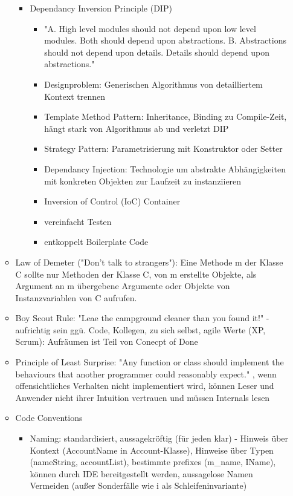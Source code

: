 \documentclass[paper=a4, fontsize=11pt]{scrartcl} %
\numberwithin{equation}{section} %
\numberwithin{figure}{section} %
\numberwithin{table}{section} %
\begin{document}
\begin{itemize}
\begin{itemize}
\begin{itemize}
\begin{itemize}
      \end{itemize}
      \item Dependancy Inversion Principle (DIP)
      \begin{itemize}
        \item "A. High level modules should not depend upon low level modules. Both should depend upon abstractions.
        B. Abstractions should not depend upon details. Details should depend upon abstractions."
        \item Designproblem: Generischen Algorithmus von detailliertem Kontext trennen
        \item Template Method Pattern: Inheritance, Binding zu Compile-Zeit, hängt stark von Algorithmus ab und verletzt DIP
        \item Strategy Pattern: Parametrisierung mit Konstruktor oder Setter
        \item Dependancy Injection: Technologie um abstrakte Abhängigkeiten mit konkreten Objekten zur Laufzeit zu instanziieren
        \item Inversion of Control (IoC) Container
        \item vereinfacht Testen
        \item entkoppelt Boilerplate Code
      \end{itemize}
    \end{itemize}
    \item Law of Demeter ("Don't talk to strangers"): Eine Methode m der Klasse C sollte nur Methoden der Klasse C, von m erstellte Objekte, als Argument an m übergebene Argumente oder Objekte von Instanzvariablen von C aufrufen.
    \item Boy Scout Rule: "Leae the campground cleaner than you found it!" - aufrichtig sein ggü. Code, Kollegen, zu sich selbst, agile Werte (XP, Scrum): Aufräumen ist Teil von Conecpt of Done
    \item Principle of Least Surprise: "Any function or class should implement the behaviours that another programmer could reasonably expect." , wenn offensichtliches Verhalten nicht implementiert wird, können Leser und Anwender nicht ihrer Intuition vertrauen und müssen Internals lesen
    \item Code Conventions
    \begin{itemize}
      \item Naming: standardisiert, aussagekröftig (für jeden klar) - Hinweis über Kontext (AccountName in Account-Klasse), Hinweise über Typen (nameString, accountList), bestimmte prefixes (m\_name, IName), können durch IDE bereitgestellt werden, aussagelose Namen Vermeiden (außer Sonderfälle wie i als Schleifeninvariante)

\end{itemize}
\end{itemize}
\end{itemize}
\end{document}
